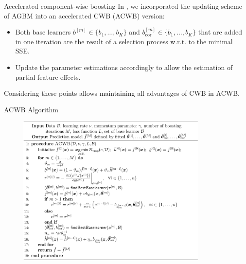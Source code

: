 \documentclass[t,10pt]{beamer}
\begin{document}

\begin{frame}{Accelerated component-wise boosting}
  In \citet{schalk2022accelerated}, we incorporated the updating scheme of AGBM into an accelerated CWB (ACWB)
  version:
  \begin{itemize}
    \item
      Both base learners \(b^{[m]}\in\{b_1, \dots, b_K\}\) and \(b^{[m]}_{\text{cor}}\in\{b_1, \dots, b_K\}\) that are added in one iteration are the
      result of a selection process w.r.t. to the minimal SSE.
    \item
      Update the parameter estimations accordingly to allow the estimation of partial feature effects.
  \end{itemize}
  Considering these points allows maintaining all advantages of CWB in ACWB.
\end{frame}

\begin{frame}{ACWB Algorithm}
   \begin{figure}
       \centering
       \includegraphics[width=0.85\textwidth]{figures/fig-acwb.png}
   \end{figure} 
\end{frame}
\end{document}
